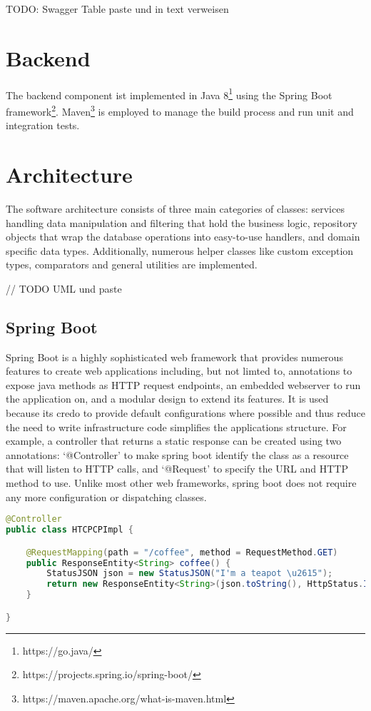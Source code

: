 TODO: Swagger Table paste und in text verweisen


\section{Backend}
The backend component ist implemented in Java 8\footnote{https://go.java/} using the Spring Boot framework\footnote{https://projects.spring.io/spring-boot/}. Maven\footnote{https://maven.apache.org/what-is-maven.html} is employed to manage the build process and run unit and integration tests.

\section{Architecture}
The software architecture consists of three main categories of classes: services handling data manipulation and filtering that hold the business logic, repository objects that wrap the database operations into easy-to-use handlers, and domain specific data types. Additionally, numerous helper classes like custom exception types, comparators and general utilities are implemented.

// TODO UML und paste

\subsection{Spring Boot}
Spring Boot is a highly sophisticated web framework that provides numerous features to create web applications including, but not limted to, annotations to expose java methods as HTTP request endpoints, an embedded webserver to run the application on, and a modular design to extend its features. It is used because its credo to provide default configurations where possible and thus reduce the need to write infrastructure code simplifies the applications structure.\cite[p. 6]{SpringGuide}
For example, a controller that returns a static response can be created using two annotations:
`@Controller' to make spring boot identify the class as a resource that will listen to HTTP calls, and `@Request' to specify the URL and HTTP method to use. Unlike most other web frameworks, spring boot does not require any more configuration or dispatching classes.

\begin{lstlisting}[language=Java]
@Controller
public class HTCPCPImpl {

	@RequestMapping(path = "/coffee", method = RequestMethod.GET)
	public ResponseEntity<String> coffee() {
		StatusJSON json = new StatusJSON("I'm a teapot \u2615");
		return new ResponseEntity<String>(json.toString(), HttpStatus.I_AM_A_TEAPOT);
	}

}
\end{lstlisting}






